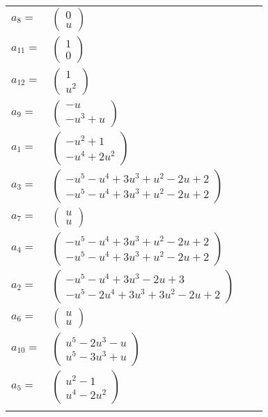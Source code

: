 \documentclass[1p]{elsarticle_modified}
\theoremstyle{definition}
\begin{document}
\begin{tabular}{m{7pt} m{180pt} m{7pt} m{180pt} }
\flushright $a_{8}=$&$\begin{pmatrix}0\\u\end{pmatrix}$ \\
\flushright $a_{11}=$&$\begin{pmatrix}1\\0\end{pmatrix}$ \\
\flushright $a_{12}=$&$\begin{pmatrix}1\\u^2\end{pmatrix}$ \\
\flushright $a_{9}=$&$\begin{pmatrix}- u\\- u^3+u\end{pmatrix}$ \\
\flushright $a_{1}=$&$\begin{pmatrix}- u^2+1\\- u^4+2 u^2\end{pmatrix}$ \\
\flushright $a_{3}=$&$\begin{pmatrix}- u^5- u^4+3 u^3+u^2-2 u+2\\- u^5- u^4+3 u^3+u^2-2 u+2\end{pmatrix}$ \\
\flushright $a_{7}=$&$\begin{pmatrix}u\\u\end{pmatrix}$ \\
\flushright $a_{4}=$&$\begin{pmatrix}- u^5- u^4+3 u^3+u^2-2 u+2\\- u^5- u^4+3 u^3+u^2-2 u+2\end{pmatrix}$ \\
\flushright $a_{2}=$&$\begin{pmatrix}- u^5- u^4+3 u^3-2 u+3\\- u^5-2 u^4+3 u^3+3 u^2-2 u+2\end{pmatrix}$ \\
\flushright $a_{6}=$&$\begin{pmatrix}u\\u\end{pmatrix}$ \\
\flushright $a_{10}=$&$\begin{pmatrix}u^5-2 u^3- u\\u^5-3 u^3+u\end{pmatrix}$ \\
\flushright $a_{5}=$&$\begin{pmatrix}u^2-1\\u^4-2 u^2\end{pmatrix}$\\&\end{tabular}
\end{document}
